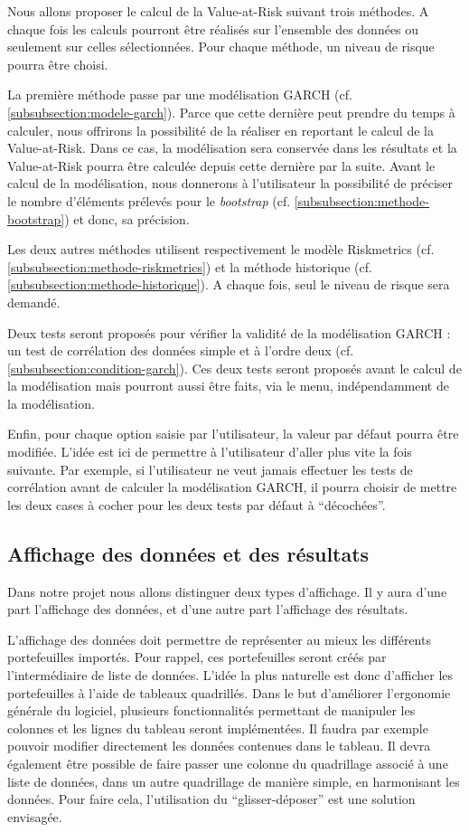 		Nous allons proposer le calcul de la Value-at-Risk suivant trois méthodes. A chaque fois les calculs pourront être réalisés sur l'ensemble des données ou seulement sur celles sélectionnées. Pour chaque méthode, un niveau de risque pourra être choisi.

		La première méthode passe par une modélisation GARCH (cf. \ref{subsubsection:modele-garch}). Parce que cette dernière peut prendre du temps à calculer, nous offrirons la possibilité de la réaliser en reportant le calcul de la Value-at-Risk. Dans ce cas, la modélisation sera conservée dans les résultats et la Value-at-Risk pourra être calculée depuis cette dernière par la suite. Avant le calcul de la modélisation, nous donnerons à l'utilisateur la possibilité de préciser le nombre d'éléments prélevés pour le \textit{bootstrap} (cf. \ref{subsubsection:methode-bootstrap}) et donc, sa précision.

		Les deux autres méthodes utilisent respectivement le modèle Riskmetrics (cf. \ref{subsubsection:methode-riskmetrics}) et la méthode historique (cf. \ref{subsubsection:methode-historique}). A chaque fois, seul le niveau de risque sera demandé.

		Deux tests seront proposés pour vérifier la validité de la modélisation GARCH : un test de corrélation des données simple et à l'ordre deux (cf. \ref{subsubsection:condition-garch}). Ces deux tests seront proposés avant le calcul de la modélisation mais pourront aussi être faits, via le menu, indépendamment de la modélisation.

		Enfin, pour chaque option saisie par l'utilisateur, la valeur par défaut pourra être modifiée. L'idée est ici de permettre à l'utilisateur d'aller plus vite la fois suivante. Par exemple, si l'utilisateur ne veut jamais effectuer les tests de corrélation avant de calculer la modélisation GARCH, il pourra choisir de mettre les deux cases à cocher pour les deux tests par défaut à “décochées”.


	\subsection{Affichage des données et des résultats} 
		Dans notre projet nous allons distinguer deux types d'affichage. Il y aura d'une part l'affichage des données, et d'une autre part l'affichage des résultats.

		L'affichage des données doit permettre de représenter au mieux les différents portefeuilles importés. Pour rappel, ces portefeuilles seront créés par l'intermédiaire de liste de données. L'idée la plus naturelle est donc d'afficher les portefeuilles à l'aide de tableaux quadrillés. Dans le but d'améliorer l'ergonomie générale du logiciel, plusieurs fonctionnalités permettant de manipuler les colonnes et les lignes du tableau seront implémentées. Il faudra par exemple pouvoir modifier directement les données contenues dans le tableau. Il devra également être possible de faire passer une colonne du quadrillage associé à une liste de données, dans un autre quadrillage de manière simple, en harmonisant les données. Pour faire cela, l'utilisation du “glisser-déposer” est une solution envisagée.

